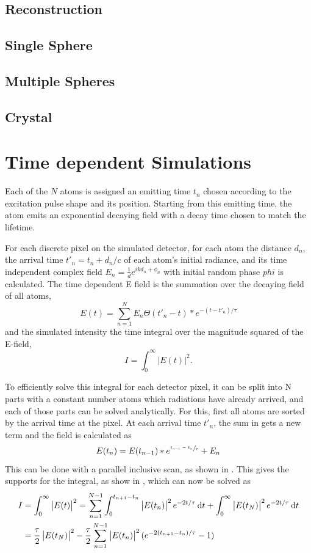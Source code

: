 \subsection{Reconstruction}


\subsection{Single Sphere}
\subsection{Multiple Spheres}
\subsection{Crystal}
\section{Time dependent Simulations}

Each of the $N$ atoms is assigned an emitting time $t_{n}$ chosen according to the excitation pulse shape and its position. Starting from this emitting time, the atom emits an exponential decaying field with a decay time chosen to match the lifetime. 


For each discrete pixel on the simulated detector, for each atom the distance $d_n$, the arrival time $t'_n=t_n+d_n/c$ of each atom's initial radiance, and its time independent complex field $E_n=\frac{1}{d} e^{ikd_n+\phi_n}$ with initial random phase $phi$ is calculated.
The time dependent E field is the summation over the decaying field of all atoms,
\begin{equation}
E(t)=\sum_{n=1}^N  E_n \Theta(t'_n  - t) * e^{-(t-t'_n )/\tau}
\label{eq:tdsum}
\end{equation}
and the simulated intensity the time integral over the magnitude squared of the E-field,
\begin{equation}
I=\int_0^\infty \left| E(t) \right|^2 .
\label{eq:tdint}
\end{equation}

To efficiently solve this integral for each detector pixel, it can be split into N parts with a constant number atoms which radiations have already arrived, and each of those parts can be solved analytically. For this, first all atoms are sorted by the arrival time at the pixel. At each arrival time $t'_n$, the sum in  gets a new term and the field is calculated as
\begin{equation}
E(t_n)=E(t_{n-1})*e^{\sfrac{t_{n-1}-t_n}{\tau}}+E_n
\end{equation}
 This can be done with a parallel inclusive scan, as shown in . This gives the supports for the integral, as show in , which can now be solved as
\begin{align}
	I&=\int_0^\infty \left| E(t) \right|^2 = \sum_{n=1}^{N-1} \int_0^{t_{n+1}-t_n} \left|E(t_n)\right|^2 e^{-2t/\tau} \dif t +\int_0^\infty \left| E(t_N)\right|^2 e^{-2t/\tau} \dif t \\
	 &=  \frac{\tau}{2}  \left|E(t_N)\right|^2 -  \frac{\tau}{2}\sum_{n=1}^{N-1} \left|E(t_n)\right|^2 (e^{-2 (t_{n+1}-t_n)/\tau} -1 ) 
\end{align}

